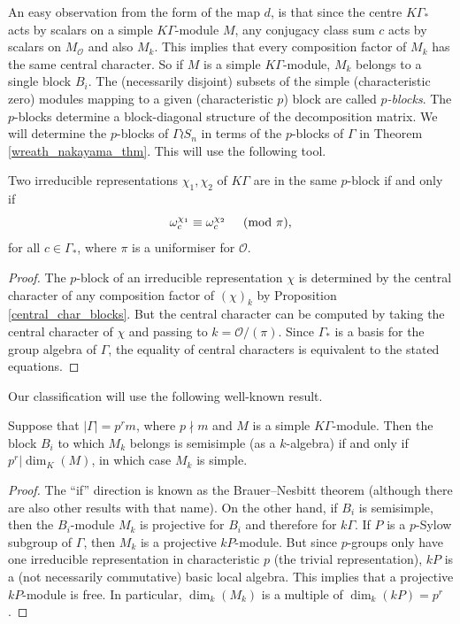 An easy observation from the form of the map $d$, is that since the centre $K\Gamma_*$ acts by scalars on a simple $K\Gamma$-module $M$, any conjugacy class sum $c$ acts by scalars on $M_{\mathcal{O}}$ and also $M_{k}$. This implies that every composition factor of $M_k$ has the same central character. So if $M$ is a simple $K\Gamma$-module, $M_{k}$ belongs to a single block $B_i$. The (necessarily disjoint) subsets of the simple (characteristic zero) modules mapping to  a given (characteristic $p$) block are called \emph{$p$-blocks}. The $p$-blocks determine a block-diagonal structure of the decomposition matrix. We will determine the $p$-blocks of $\Gamma \wr S_n$ in terms of the $p$-blocks of $\Gamma$ in Theorem \ref{wreath_nakayama_thm}. 
This will use the following tool.
\begin{proposition} \label{block_prop}
Two irreducible representations $\chi_1, \chi_2$ of $K\Gamma$ are in the same $p$-block if and only if
\[
\omega_c^{\chi_1} \equiv \omega_c^{\chi_2} \hspace{5mm} (\mbox{$\mathrm{mod}$ $\pi$}),
\]
for all $c \in \Gamma_*$, where $\pi$ is a uniformiser for $\mathcal{O}$.
\end{proposition}
\begin{proof}
The $p$-block of an irreducible representation $\chi$ is determined by the central character of any composition factor of $(\chi)_k$ by Proposition \ref{central_char_blocks}. But the central character can be computed by taking the central character of $\chi$ and passing to $k = \mathcal{O}/(\pi)$. Since $\Gamma_*$ is a basis for the group algebra of $\Gamma$, the equality of central characters is equivalent to the stated equations.
\end{proof}

Our classification will use the following well-known result.
\begin{proposition} \label{brauer_nesbitt_prop}
Suppose that $|\Gamma| = p^r m$, where $p \nmid m$ and $M$ is a simple $K\Gamma$-module. Then the block $B_i$ to which $M_k$ belongs is semisimple (as a $k$-algebra) if and only if $p^r | \dim_K(M)$, in which case $M_k$ is simple.
\end{proposition}
\begin{proof}
The ``if'' direction is known as the Brauer--Nesbitt theorem (although there are also other results with that name). On the other hand, if $B_i$ is semisimple, then the $B_i$-module $M_k$ is projective for $B_i$ and therefore for $k\Gamma$. If $P$ is a $p$-Sylow subgroup of $\Gamma$, then $M_k$ is a projective $kP$-module. But since $p$-groups only have one irreducible representation in characteristic $p$ (the trivial representation), $kP$ is a (not necessarily commutative) basic local algebra. This implies that a projective $kP$-module is free. In particular, $\dim_k(M_k)$ is a multiple of $\dim_k(kP) = p^r$.
\end{proof}



